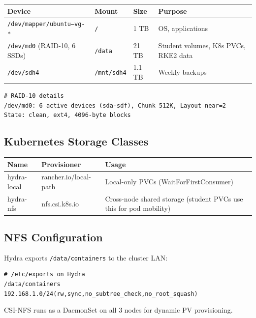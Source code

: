 \documentclass[11pt,a4paper]{article}
\begin{document}
\begin{table}[H]
\centering
\begin{tabular}{llll}
\toprule
\textbf{Device} & \textbf{Mount} & \textbf{Size} & \textbf{Purpose} \\
\midrule
\texttt{/dev/mapper/ubuntu--vg-*} & \texttt{/} & 1 TB & OS, applications \\
\texttt{/dev/md0} (RAID-10, 6 SSDs) & \texttt{/data} & 21 TB & Student volumes, K8s PVCs, RKE2 data \\
\texttt{/dev/sdh4} & \texttt{/mnt/sdh4} & 1.1 TB & Weekly backups \\
\bottomrule
\end{tabular}
\end{table}

\begin{lstlisting}[style=bash]
# RAID-10 details
/dev/md0: 6 active devices (sda-sdf), Chunk 512K, Layout near=2
State: clean, ext4, 4096-byte blocks
\end{lstlisting}

\subsection{Kubernetes Storage Classes}

\begin{table}[H]
\centering
\begin{tabular}{llp{5cm}}
\toprule
\textbf{Name} & \textbf{Provisioner} & \textbf{Usage} \\
\midrule
hydra-local & rancher.io/local-path & Local-only PVCs (WaitForFirstConsumer) \\
hydra-nfs & nfs.csi.k8s.io & Cross-node shared storage (student PVCs use this for pod mobility) \\
\bottomrule
\end{tabular}
\end{table}

\subsection{NFS Configuration}

Hydra exports \texttt{/data/containers} to the cluster LAN:

\begin{lstlisting}[style=bash]
# /etc/exports on Hydra
/data/containers 192.168.1.0/24(rw,sync,no_subtree_check,no_root_squash)
\end{lstlisting}

CSI-NFS runs as a DaemonSet on all 3 nodes for dynamic PV provisioning.
\end{document}
